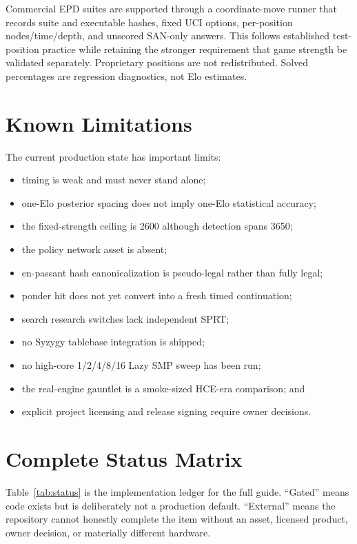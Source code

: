 \documentclass[conference]{IEEEtranSSP}
\begin{document}
Commercial EPD suites are supported through a coordinate-move runner that records suite and executable hashes, fixed UCI options, per-position nodes/time/depth, and unscored SAN-only answers. This follows established test-position practice \cite{cpw} while retaining the stronger requirement that game strength be validated separately. Proprietary positions are not redistributed. Solved percentages are regression diagnostics, not Elo estimates.

\section{Known Limitations}
The current production state has important limits:
\begin{itemize}
  \item timing is weak and must never stand alone;
  \item one-Elo posterior spacing does not imply one-Elo statistical accuracy;
  \item the fixed-strength ceiling is 2600 although detection spans 3650;
  \item the policy network asset is absent;
  \item en-passant hash canonicalization is pseudo-legal rather than fully legal;
  \item ponder hit does not yet convert into a fresh timed continuation;
  \item search research switches lack independent SPRT;
  \item no Syzygy tablebase integration is shipped;
  \item no high-core 1/2/4/8/16 Lazy SMP sweep has been run;
  \item the real-engine gauntlet is a smoke-sized HCE-era comparison; and
  \item explicit project licensing and release signing require owner decisions.
\end{itemize}

\section{Complete Status Matrix}
Table~\ref{tab:status} is the implementation ledger for the full guide. ``Gated'' means code exists but is deliberately not a production default. ``External'' means the repository cannot honestly complete the item without an asset, licensed product, owner decision, or materially different hardware.
\end{document}
